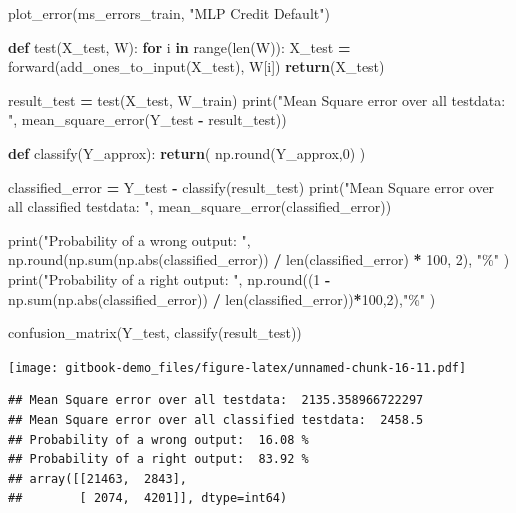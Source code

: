\documentclass[
]{book}
\newenvironment{Shaded}{\begin{snugshade}}{\end{snugshade}}
\newcommand{\BuiltInTok}[1]{#1}
\newcommand{\ControlFlowTok}[1]{\textcolor[rgb]{0.13,0.29,0.53}{\textbf{#1}}}
\newcommand{\DecValTok}[1]{\textcolor[rgb]{0.00,0.00,0.81}{#1}}
\newcommand{\KeywordTok}[1]{\textcolor[rgb]{0.13,0.29,0.53}{\textbf{#1}}}
\newcommand{\NormalTok}[1]{#1}
\newcommand{\OperatorTok}[1]{\textcolor[rgb]{0.81,0.36,0.00}{\textbf{#1}}}
\newcommand{\StringTok}[1]{\textcolor[rgb]{0.31,0.60,0.02}{#1}}
\begin{document}
\begin{Shaded}
\begin{Highlighting}[]
\NormalTok{plot\_error(ms\_errors\_train, }\StringTok{"MLP Credit Default"}\NormalTok{)}



\KeywordTok{def}\NormalTok{ test(X\_test, W):}
  \ControlFlowTok{for}\NormalTok{ i }\KeywordTok{in} \BuiltInTok{range}\NormalTok{(}\BuiltInTok{len}\NormalTok{(W)):}
\NormalTok{    X\_test }\OperatorTok{=}\NormalTok{ forward(add\_ones\_to\_input(X\_test), W[i])}
  \ControlFlowTok{return}\NormalTok{(X\_test)}
  

\NormalTok{result\_test }\OperatorTok{=}\NormalTok{ test(X\_test, W\_train)}
\BuiltInTok{print}\NormalTok{(}\StringTok{"Mean Square error over all testdata: "}\NormalTok{, mean\_square\_error(Y\_test }\OperatorTok{{-}}\NormalTok{ result\_test))}


\KeywordTok{def}\NormalTok{ classify(Y\_approx):}
  \ControlFlowTok{return}\NormalTok{( np.}\BuiltInTok{round}\NormalTok{(Y\_approx,}\DecValTok{0}\NormalTok{) )}

\NormalTok{classified\_error }\OperatorTok{=}\NormalTok{ Y\_test }\OperatorTok{{-}}\NormalTok{ classify(result\_test)}
\BuiltInTok{print}\NormalTok{(}\StringTok{"Mean Square error over all classified testdata: "}\NormalTok{, mean\_square\_error(classified\_error))}

\BuiltInTok{print}\NormalTok{(}\StringTok{"Probability of a wrong output: "}\NormalTok{, np.}\BuiltInTok{round}\NormalTok{(np.}\BuiltInTok{sum}\NormalTok{(np.}\BuiltInTok{abs}\NormalTok{(classified\_error)) }\OperatorTok{/} \BuiltInTok{len}\NormalTok{(classified\_error) }\OperatorTok{*} \DecValTok{100}\NormalTok{, }\DecValTok{2}\NormalTok{), }\StringTok{"\%"}\NormalTok{ )}
\BuiltInTok{print}\NormalTok{(}\StringTok{"Probability of a right output: "}\NormalTok{, np.}\BuiltInTok{round}\NormalTok{((}\DecValTok{1} \OperatorTok{{-}}\NormalTok{ np.}\BuiltInTok{sum}\NormalTok{(np.}\BuiltInTok{abs}\NormalTok{(classified\_error)) }\OperatorTok{/} \BuiltInTok{len}\NormalTok{(classified\_error))}\OperatorTok{*}\DecValTok{100}\NormalTok{,}\DecValTok{2}\NormalTok{),}\StringTok{"\%"}\NormalTok{ )}


\NormalTok{confusion\_matrix(Y\_test, classify(result\_test))}
\end{Highlighting}
\end{Shaded}

\texttt{[image: gitbook-demo\_files/figure-latex/unnamed-chunk-16-11.pdf]}

\begin{verbatim}
## Mean Square error over all testdata:  2135.358966722297
## Mean Square error over all classified testdata:  2458.5
## Probability of a wrong output:  16.08 %
## Probability of a right output:  83.92 %
## array([[21463,  2843],
##        [ 2074,  4201]], dtype=int64)
\end{verbatim}
\end{document}
